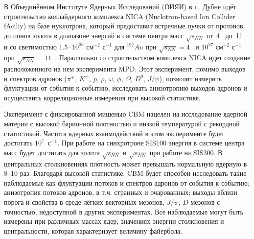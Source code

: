 
В Объединённом Институте Ядерных Исследований (ОИЯИ) в г.~Дубне идёт строительство коллайдерного комплекса NICA (Nuclotron-based Ion Collider fAciliy) на базе нуклотрона, который предоставит встречные пучки от протонов до ионов золота в диапазоне энергий в системе центра масс $\sqrt{s_{NN}}$ от~4~\GeVperNucl{} до~11~\GeVperNucl{} и со светимостью $1.5 \cdot 10^{26}$ см$^{-2}$ с$^{-1}$ для $^{197}Au$ при $\sqrt{s_{NN}}=4$~\GeVperNucl{} и $10^{27}$ см$^{-2}$ с$^{-1}$ при $\sqrt{s_{NN}}=11$~\GeVperNucl. Параллельно со строительством комплекса NICA идет создание расположенного на нем эксперимента MPD. Этот эксперимент, помимо выходов и спектров адронов ($\pi^{+}$, $K^{+}$, $p$, $\rho$, $\omega$, $\phi$, $\Omega$, $D^{0}$, $J/\psi$), позволит измерить флуктуации от события к событию, исследовать анизотропию выходов адронов и осуществить корреляционные измерения при высокой статистике.

\bigskip




Эксперимент с фиксированной мишенью CBM нацелен на исследование ядерной материи с высокой барионной плотностью и низкой температурой с рекордной статистикой. Частота ядерных взаимодействий в этом эксперименте будет достигать $10^7$~с$^{-1}$. При работе на синхротроне SIS100 энергия в системе центра масс будет достигать для золота $\sqrt{s_{NN}}$ \todo и $\sqrt{s_{NN}}$ \todo при работе на SIS300. В центральных столкновениях плотность может превышать нормальную ядерную в 8--10 раз. Благодаря высокой статистике, CBM будет способен исследовать такие наблюдаемые как флуктуации потоков и спектров адронов от события к событию; анизотропия потоков адронов, в т.ч. странных и очарованных; выходы вблизи порога и свойства в среде лёгких векторных мезонов, $J/\psi$, $D$-мезонов с точностью, недоступной в других экспериментах. Все наблюдаемые могут быть измерены при различных массах ядер, значениях энергии столкновения и центральности, которая характеризует величину файербола.


\bigskip


